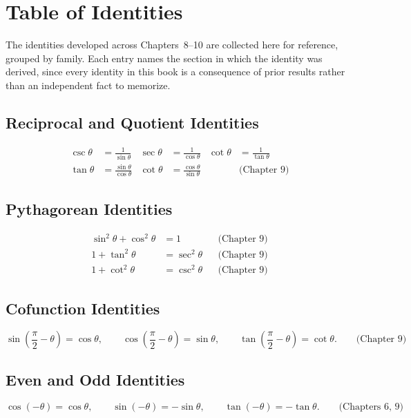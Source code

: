 \chapter{Table of Identities}
\label{app:identities}

The identities developed across Chapters~8--10 are collected here for
reference, grouped by family. Each entry names the section in which the
identity was derived, since every identity in this book is a consequence
of prior results rather than an independent fact to memorize.

\section{Reciprocal and Quotient Identities}

\begin{align*}
\csc\theta &= \frac{1}{\sin\theta} & \sec\theta &= \frac{1}{\cos\theta} &
\cot\theta &= \frac{1}{\tan\theta} \\
\tan\theta &= \frac{\sin\theta}{\cos\theta} & \cot\theta &=
\frac{\cos\theta}{\sin\theta} & & \text{(Chapter 9)}
\end{align*}

\section{Pythagorean Identities}

\begin{align*}
\sin^2\theta + \cos^2\theta &= 1 & &\text{(Chapter 9)} \\
1 + \tan^2\theta &= \sec^2\theta & &\text{(Chapter 9)} \\
1 + \cot^2\theta &= \csc^2\theta & &\text{(Chapter 9)}
\end{align*}

\section{Cofunction Identities}

\[
\sin\left(\frac{\pi}{2} - \theta\right) = \cos\theta, \qquad
\cos\left(\frac{\pi}{2} - \theta\right) = \sin\theta, \qquad
\tan\left(\frac{\pi}{2} - \theta\right) = \cot\theta. \qquad \text{(Chapter
9)}
\]

\section{Even and Odd Identities}

\[
\cos(-\theta) = \cos\theta, \qquad \sin(-\theta) = -\sin\theta, \qquad
\tan(-\theta) = -\tan\theta. \qquad \text{(Chapters 6, 9)}
\]


